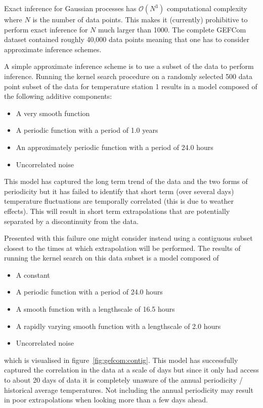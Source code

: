 Exact inference for Gaussian processes has $\mathcal{O}(N^3)$  computational complexity where $N$ is the number of data points.
This makes it (currently) prohibitive to perform exact inference for $N$ much larger than 1000.
The complete GEFCom dataset contained roughly 40,000 data points meaning that one has to consider approximate inference schemes.

A simple approximate inference scheme is to use a subset of the data to perform inference\citep[e.g.][]{Quinonero-Candela2005-er}.
Running the kernel search procedure on a randomly selected 500 data point subset of the data for temperature station 1 results in a model composed of the following additive components:
\begin{itemize}
  \item A very smooth function
  \item A periodic function with a period of 1.0 years
  \item An approximately periodic function with a period of 24.0 hours
  \item Uncorrelated noise
\end{itemize}
This model has captured the long term trend of the data and the two forms of periodicity but it has failed to identify that short term (over several days) temperature fluctuations are temporally correlated (this is due to weather effects).
This will result in short term extrapolations that are potentially separated by a discontinuity from the data.%

Presented with this failure one might consider instead using a contiguous subset closest to the times at which extrapolation will be performed.
The results of running the kernel search on this data subset is a model composed of
\begin{itemize}
  \item A constant
  \item A periodic function with a period of 24.0 hours
  \item A smooth function with a lengthscale of 16.5 hours
  \item A rapidly varying smooth function with a lengthscale of 2.0 hours
  \item Uncorrelated noise
\end{itemize}
which is visualised in figure~\ref{fig:gefcom:contig}.
This model has successfully captured the correlation in the data at a scale of days but since it only had access to about 20 days of data it is completely unaware of the annual periodicity / historical average temperatures.
Not including the annual periodicity may result in poor extrapolations when looking more than a few days ahead.

